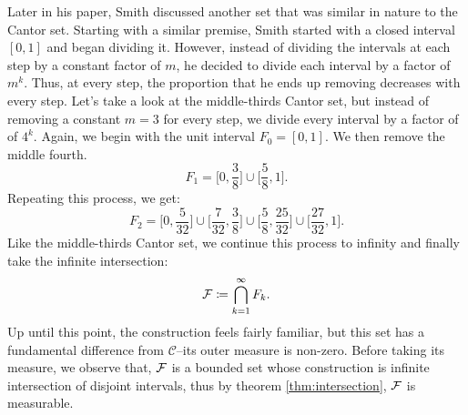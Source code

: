 \documentclass{article}
\theoremstyle{axiom} \newtheorem{axiom}{Axiom}
\theoremstyle{definition} \newtheorem{definition}{Definition}
\theoremstyle{example} \newtheorem{example}{Example}
\theoremstyle{proposition} \newtheorem{prop}{Proposition}
\theoremstyle{lemma} \newtheorem{lemma}{Lemma}
\newcommand{\sC}{\mathcal{C}}  \newcommand{\sD}{\mathcal{D}}
\begin{document}
Later in his paper, Smith discussed another set that was similar in nature to
the Cantor set. Starting with a similar premise, Smith started with a closed 
interval $[0,1]$ and began dividing it. However, instead of dividing the intervals
at each step by a constant factor of $m$, he decided to divide each interval 
by a factor of $m^k$. Thus, at every step, the proportion that he ends up 
removing decreases with every step. Let's take a look at the middle-thirds 
Cantor set, but instead of removing a constant $m = 3$ for every step,
we divide every interval by a factor of  of $4^k$. Again, we begin with the
unit interval $F_0 = [0,1]$. We then remove the middle fourth. 
\begin{equation*}
	F_1 = \bigg[0,\frac{3}{8}\bigg] \cup \bigg[\frac{5}{8},1\bigg].
\end{equation*}
Repeating this process, we get:
\begin{equation*}
	F_2 = \bigg[0,\frac{5}{32}\bigg] \cup \bigg[\frac{7}{32},\frac{3}{8}\bigg] 
	\cup \bigg[\frac{5}{8},\frac{25}{32}\bigg] \cup \bigg[\frac{27}{32},1\bigg].
\end{equation*}
Like the middle-thirds Cantor set, we continue this process to infinity and finally
take the infinite intersection:
\begin{equation}
\mathcal{F} \coloneqq \bigcap^{\infty}_{k=1} F_k.
\end{equation}
Up until this point, the construction feels fairly familiar, but this set has
a fundamental difference from $\sC$--its outer measure is non-zero. 
Before taking its measure, we observe that, $\mathcal{F}$ is a bounded set whose 
construction is infinite intersection of  disjoint intervals, thus by 
theorem \ref{thm:intersection}, $\mathcal{F}$ is measurable.
\end{document}
